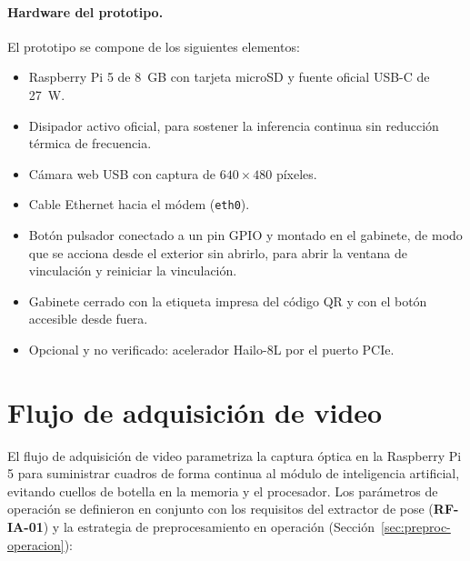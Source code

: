 \documentclass[12pt,a4paper,oneside]{book}
\theoremstyle{plain}
\theoremstyle{definition}
\theoremstyle{remark}
\begin{document}
\paragraph{Hardware del prototipo.} El prototipo se compone de los siguientes elementos:

\begin{itemize}
  \item Raspberry Pi 5 de 8~GB con tarjeta microSD y fuente oficial USB-C de 27~W.
  \item Disipador activo oficial, para sostener la inferencia continua sin reducción térmica de frecuencia.
  \item Cámara web USB con captura de $640 \times 480$ píxeles.
  \item Cable Ethernet hacia el módem (\texttt{eth0}).
  \item Botón pulsador conectado a un pin GPIO y montado en el gabinete, de modo que se acciona desde el exterior sin abrirlo, para abrir la ventana de vinculación y reiniciar la vinculación.
  \item Gabinete cerrado con la etiqueta impresa del código QR y con el botón accesible desde fuera.
  \item Opcional y no verificado: acelerador Hailo-8L por el puerto PCIe.
\end{itemize}

\section{Flujo de adquisición de video}
\label{sec:flujo-adquisicion}

El flujo de adquisición de video parametriza la captura óptica en la Raspberry Pi 5 para suministrar cuadros de forma continua al módulo de inteligencia artificial, evitando cuellos de botella en la memoria y el procesador. Los parámetros de operación se definieron en conjunto con los requisitos del extractor de pose (\textbf{RF-IA-01}) y la estrategia de preprocesamiento en operación (Sección~\ref{sec:preproc-operacion}):
\end{document}
